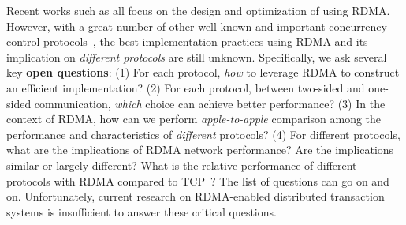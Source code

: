 Recent works such as \cite{kalia2016fasst,dragojevic2014farm,wei2018deconstructing} all focus on the design and optimization of \occ using RDMA. 
However, with a great number of other well-known
and important concurrency control protocols~\cite{mu2014extracting,mahmoud2014maat,roy2015homeostasis,escriva2015warp,cowling2012granola}, 
the best implementation practices using 
RDMA and its implication 
on {\em different protocols} are still unknown. 
Specifically, we ask several key
{\bf open questions}: 
(1) For each protocol, {\em how} to leverage 
RDMA to construct an efficient implementation?
(2) For each protocol, between two-sided 
and one-sided communication, {\em which} choice
can achieve better performance?
(3) In the context of RDMA, how can we perform
{\em apple-to-apple} comparison among the 
performance and characteristics of 
{\em different} protocols?
(4) For different protocols, what are the 
implications of RDMA network performance? 
Are the implications similar or largely different?
What is the relative performance of different
protocols with RDMA compared to TCP~\cite{harding2017evaluation}?
The list of questions can go on and on. 
Unfortunately, current research on RDMA-enabled distributed transaction systems is insufficient
to answer these critical questions. 





